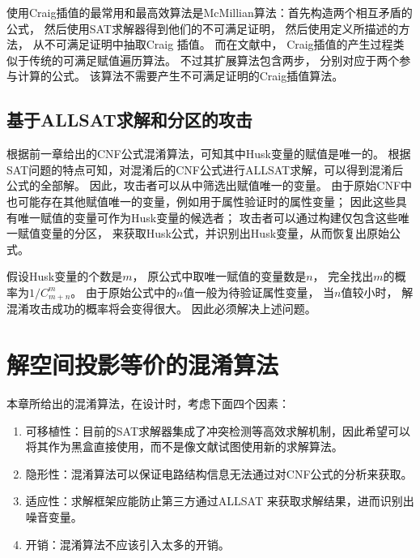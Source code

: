 使用Craig插值的最常用和最高效算法是McMillian算法：首先构造两个相互矛盾的公式，
然后使用SAT求解器得到他们的不可满足证明，
然后使用定义所描述的方法，
从不可满足证明中抽取Craig 插值。
而在文献中，
Craig插值的产生过程类似于传统的可满足赋值遍历算法。
不过其扩展算法包含两步，
分别对应于两个参与计算的公式。
该算法不需要产生不可满足证明的Craig插值算法。

\subsection{基于ALLSAT求解和分区的攻击}
根据前一章给出的CNF公式混淆算法，可知其中Husk变量的赋值是唯一的。
根据SAT问题的特点可知，对混淆后的CNF公式进行ALLSAT求解，可以得到混淆后公式的全部解。
因此，攻击者可以从中筛选出赋值唯一的变量。
由于原始CNF中也可能存在其他赋值唯一的变量，例如用于属性验证时的属性变量；
因此这些具有唯一赋值的变量可作为Husk变量的候选者；
攻击者可以通过构建仅包含这些唯一赋值变量的分区，
来获取Husk公式，并识别出Husk变量，从而恢复出原始公式。

假设Husk变量的个数是$m$，
原公式中取唯一赋值的变量数是$n$，
完全找出$m$的概率为$1/{C_{m+n}^m}$。	
由于原始公式中的$n$值一般为待验证属性变量，
当$n$值较小时，
解混淆攻击成功的概率将会变得很大。
因此必须解决上述问题。



\section{解空间投影等价的混淆算法}
本章所给出的混淆算法，在设计时，考虑下面四个因素：

\begin{enumerate}
 \item
可移植性：目前的SAT求解器集成了冲突检测等高效求解机制，因此希望可以将其作为黑盒直接使用，而不是像文献试图使用新的求解算法。
 \item \label{4:g2}
隐形性：混淆算法可以保证电路结构信息无法通过对CNF公式的分析来获取。
\item \label{4:g3}
适应性：求解框架应能防止第三方通过ALLSAT 来获取求解结果，进而识别出噪音变量。
 \item
开销：混淆算法不应该引入太多的开销。
\end{enumerate}

